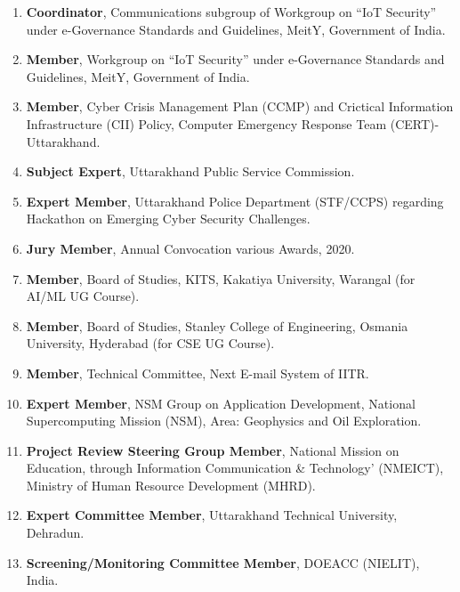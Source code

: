\begin{enumerate}
	
\item 
\textbf{Coordinator}, Communications subgroup of Workgroup on “IoT Security” under e-Governance Standards and Guidelines, MeitY, Government of India. 

\item 
\textbf{Member}, Workgroup on “IoT Security” under e-Governance Standards and Guidelines, MeitY, Government of India. 

\item
\textbf{Member}, Cyber Crisis Management Plan (CCMP) and Crictical Information Infrastructure (CII) Policy, Computer Emergency Response Team (CERT)-Uttarakhand.

\item 
\textbf{Subject Expert}, Uttarakhand Public Service Commission.

\item
\textbf{Expert Member}, Uttarakhand Police Department (STF/CCPS) regarding Hackathon on Emerging Cyber Security Challenges.

\item 
\textbf{Jury Member}, Annual Convocation various Awards, 2020.

\item 
\textbf{Member}, Board of Studies, KITS, Kakatiya University, Warangal (for AI/ML UG Course).

\item 
\textbf{Member}, Board of Studies, Stanley College of Engineering, Osmania University, Hyderabad (for CSE UG Course).

\item
\textbf{Member}, Technical Committee, Next E-mail System of IITR.

\item
\textbf{Expert Member}, NSM  Group on Application Development, National Supercomputing Mission (NSM), Area: Geophysics and Oil Exploration.

\item
\textbf{Project  Review Steering Group Member}, National Mission on Education, through Information Communication \& Technology’ (NMEICT), Ministry of Human Resource Development (MHRD).

\item
\textbf{Expert Committee Member}, Uttarakhand Technical University, Dehradun.

\item
\textbf{Screening/Monitoring Committee Member}, DOEACC (NIELIT), India.


\end{enumerate}

